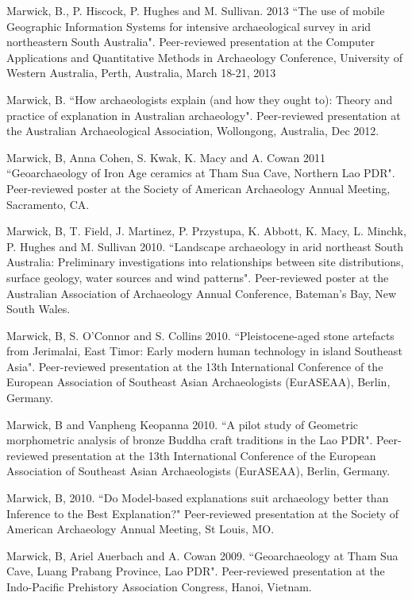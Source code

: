 \ind Marwick, B., P. Hiscock, P. Hughes and M. Sullivan. 2013 ``The use of mobile Geographic Information Systems for intensive archaeological survey in arid northeastern South Australia". Peer-reviewed presentation at the Computer Applications and Quantitative Methods in Archaeology Conference, University of Western Australia, Perth, Australia, March 18-21, 2013

\ind Marwick, B. ``How archaeologists explain (and how they ought to): Theory and practice of explanation in Australian archaeology". Peer-reviewed presentation at the Australian Archaeological Association, Wollongong, Australia, Dec 2012.

\ind Marwick, B, Anna Cohen, S. Kwak, K. Macy and A. Cowan 2011 ``Geoarchaeology of Iron Age ceramics at Tham Sua Cave, Northern Lao PDR". Peer-reviewed poster at the Society of American Archaeology Annual Meeting, Sacramento, CA.

\ind Marwick, B, T. Field, J. Martinez, P. Przystupa, K. Abbott, K. Macy, L. Minchk, P. Hughes and M. Sullivan 2010. ``Landscape archaeology in arid northeast South Australia: Preliminary investigations into relationships between site distributions, surface geology, water sources and wind patterns". Peer-reviewed poster at the Australian Association of Archaeology Annual Conference, Bateman’s Bay, New South Wales.

\ind Marwick, B, S. O’Connor and S. Collins 2010. ``Pleistocene-aged stone artefacts from Jerimalai, East Timor: Early modern human technology in island Southeast Asia". Peer-reviewed presentation at the 13th International Conference of the European Association of Southeast Asian Archaeologists (EurASEAA), Berlin, Germany.

\ind Marwick, B and Vanpheng Keopanna 2010. ``A pilot study of Geometric morphometric analysis of bronze Buddha craft traditions in the Lao PDR". Peer-reviewed presentation  at the 13th International Conference of the European Association of Southeast Asian Archaeologists (EurASEAA), Berlin, Germany.

\ind Marwick, B, 2010. ``Do Model-based explanations suit archaeology better than Inference to the Best Explanation?" Peer-reviewed presentation at the Society of American Archaeology Annual Meeting, St Louis, MO.

\ind Marwick, B, Ariel Auerbach and A. Cowan 2009. ``Geoarchaeology at Tham Sua Cave, Luang Prabang Province, Lao PDR". Peer-reviewed presentation at the Indo-Pacific Prehistory Association Congress, Hanoi, Vietnam.


